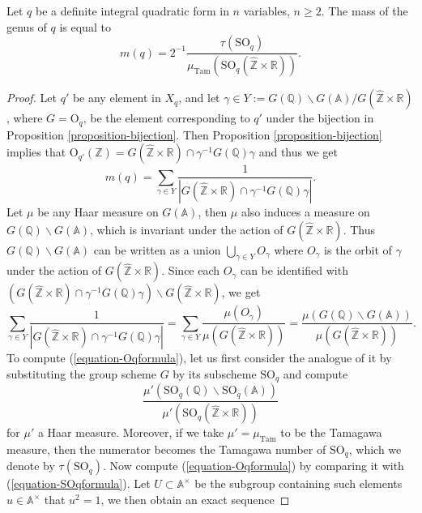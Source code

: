 \begin{proposition}
\label{proposition-SMSmassformula}
Let $q$ be a definite integral quadratic form in  $n$ variables, $n\geq 2$. The mass of the genus of $q$ is equal to 
\[
	m(q)=2^{-1}\frac{\tau(\text{SO}_q)}{\mu_{\text{Tam}}(\text{SO}_{q}(\hat{\mathbb{Z}}\times \mathbb{R}))}.
\]  
\end{proposition}
\begin{proof}
	Let $q'$ be any element in $X_q$, and let $\gamma\in Y:=G(\mathbb{Q})\backslash G(\mathbb{A})/G(\hat{\mathbb{Z}}\times \mathbb{R})$, where $G=\text{O}_q$, be the element corresponding to $q'$ under the bijection in Proposition \ref{proposition-bijection}. Then Proposition \ref{proposition-bijection} implies that $\text{O}_{q'}(\mathbb{Z})=G(\hat{\mathbb{Z}}\times \mathbb{R})\cap \gamma^{-1}G(\mathbb{Q})\gamma$ and thus we get 
	\begin{equation*}
		m(q)=\sum_{\gamma\in Y} \frac{1}{|G(\hat{\mathbb{Z}}\times \mathbb{R})\cap \gamma^{-1}G(\mathbb{Q})\gamma|}.
	\end{equation*}
	Let $\mu$ be any Haar measure on $G(\mathbb{A})$, then $\mu$ also induces a measure on $G(\mathbb{Q})\backslash G(\mathbb{A})$, which is invariant under the action of $G(\hat{\mathbb{Z}}\times\mathbb{R})$. Thus $G(\mathbb{Q})\backslash G(\mathbb{A})$ can be written as a union $\bigcup_{\gamma\in Y} O_{\gamma}$ where $O_{\gamma}$ is the orbit of $\gamma$ under the action of $G(\hat{\mathbb{Z}}\times\mathbb{R})$. Since each $O_{\gamma}$ can be identified with $(G(\hat{\mathbb{Z}}\times \mathbb{R})\cap \gamma^{-1}G(\mathbb{Q})\gamma)\backslash G(\hat{\mathbb{Z}}\times \mathbb{R})$, we get 
\begin{equation}
\label{equation-Oqformula}
\sum_{\gamma\in Y}\frac{1}{|G(\hat{\mathbb{Z}}\times \mathbb{R})\cap \gamma^{-1}G(\mathbb{Q})\gamma|} = \sum_{\gamma\in Y}\frac{\mu(O_{\gamma})}{\mu(G(\hat{\mathbb{Z}}\times \mathbb{R}))} = \frac{\mu(G(\mathbb{Q})\backslash G(\mathbb{A}))}{\mu(G(\hat{\mathbb{Z}}\times \mathbb{R}))}.
\end{equation}
	To compute (\ref{equation-Oqformula}), let us first consider the analogue of it by substituting the group scheme $G$ by its subscheme $\text{SO}_q$ and compute 
\begin{equation}\label{equation-SOqformula}
	\frac{\mu'(\text{SO}_q(\mathbb{Q})\backslash \text{SO}_q(\mathbb{A}))}{\mu'(\text{SO}_q(\hat{\mathbb{Z}}\times\mathbb{R}))}
\end{equation}
for $\mu'$ a Haar measure. Moreover, if we take $\mu'=\mu_{\text{Tam}}$ to be the Tamagawa measure, then the numerator becomes the Tamagawa number of $\text{SO}_q$, which we denote by $\tau(\text{SO}_q)$. Now compute (\ref{equation-Oqformula}) by comparing it with (\ref{equation-SOqformula}). Let $U\subset \mathbb{A}^{\times}$ be the subgroup containing such elements $u\in \mathbb{A}^{\times}$ that $u^2=1$, we then obtain an exact sequence 

\end{proof}
